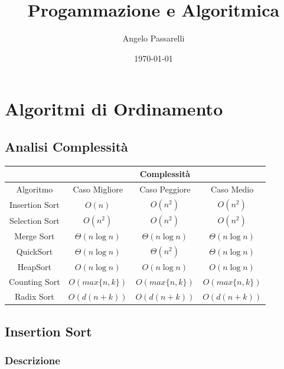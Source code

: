 \documentclass{article}
\title{Progammazione e Algoritmica}
\author{Angelo Passarelli}
\date{\today}
\begin{document}
\maketitle

\tableofcontents

\pagebreak

\section{Algoritmi di Ordinamento}

\subsection{Analisi Complessità}

\begin{center}
    \begin{tabular}{|c|c|c|c|}
        \hline
        & \multicolumn{3}{c|}{Complessità} \\
        \hline
        Algoritmo & Caso Migliore & Caso Peggiore & Caso Medio \\ \hline
        Insertion Sort & $O(n)$ & $O(n^2)$ & $O(n^2)$ \\ \hline
        Selection Sort & $O(n^2)$ & $O(n^2)$ & $O(n^2)$ \\ \hline
        Merge Sort & $\Theta(n \log n)$ & $\Theta(n \log n)$ & $\Theta(n \log n)$ \\ \hline
        QuickSort & $\Theta(n \log n)$ & $\Theta(n^2)$ & $\Theta(n \log n)$ \\ \hline
        HeapSort & $O(n \log n)$ & $O(n \log n)$ & $O(n \log n)$ \\ \hline
        Counting Sort & $O(max\{n, k\})$ & $O(max\{n, k\})$ & $O(max\{n, k\})$ \\ \hline
        Radix Sort & $O(d(n + k))$ & $O(d(n + k))$ & $O(d(n + k))$ \\ \hline       
    \end{tabular}
\end{center}

\subsection{Insertion Sort}

\subsubsection{Descrizione}
\end{document}
